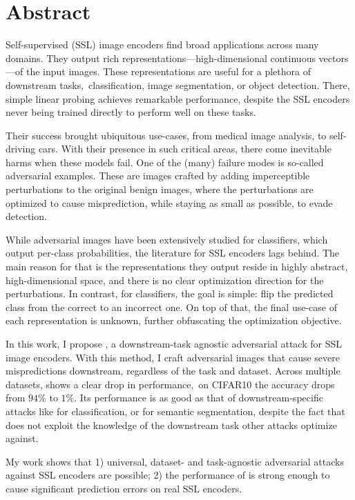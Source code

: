 \chapter*{Abstract}

Self-supervised (SSL) image encoders find broad applications across many domains. They output rich representations---high-dimensional continuous vectors---of the input images. These representations are useful for a plethora of downstream tasks,~\eg classification, image segmentation, or object detection. There, simple linear probing achieves remarkable performance, despite the SSL encoders never being trained directly to perform well on these tasks.

Their success brought ubiquitous use-cases, from medical image analysis, to self-driving cars. With their presence in such critical areas, there come inevitable harms when these models fail. One of the (many) failure modes is so-called adversarial examples. These are images crafted by adding imperceptible perturbations to the original benign images, where the perturbations are optimized to cause misprediction, while staying as small as possible, to evade detection. 

While adversarial images have been extensively studied for classifiers, which output per-class probabilities, the literature for SSL encoders lags behind. The main reason for that is the representations they output reside in highly abstract, high-dimensional space, and there is no clear optimization direction for the perturbations. In contrast, for classifiers, the goal is simple: flip the predicted class from the correct to an incorrect one. On top of that, the final use-case of each representation is unknown, further obfuscating the optimization objective.

In this work, I propose \EmbedAttack, a downstream-task agnostic adversarial attack for SSL image encoders. With this method, I craft adversarial images that cause severe mispredictions downstream, regardless of the task and dataset. Across multiple datasets, \EmbedAttack shows a clear drop in performance,~\eg on CIFAR10 the accuracy drops from $94\%$ to $1\%$. Its performance is as good as that of downstream-specific attacks like \PGD for classification, or \SegPGD for semantic segmentation, despite the fact that \EmbedAttack does not exploit the knowledge of the downstream task other attacks optimize against.

My work shows that 1) universal, dataset- and task-agnostic adversarial attacks against SSL encoders are possible; 2) the performance of \EmbedAttack is strong enough to cause significant prediction errors on real SSL encoders.
